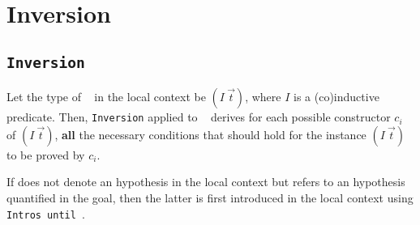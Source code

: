 \section{Inversion}
\label{Inversion}

\subsection{\tt Inversion {\ident}}

Let the type of \ident~ in the local context be $(I~\vec{t})$,
where $I$ is a (co)inductive predicate. Then,
\texttt{Inversion} applied to \ident~ derives for each possible
constructor $c_i$ of $(I~\vec{t})$, {\bf all} the necessary
conditions that should hold for the instance $(I~\vec{t})$ to be
proved by $c_i$.

\Rem If {\ident} does not denote an hypothesis in the local context
but refers to an hypothesis quantified in the goal, then the
latter is first introduced in the local context using
\texttt{Intros until \ident}.

